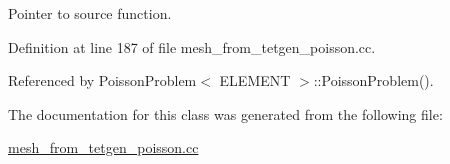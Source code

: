 Pointer to source function. 



Definition at line 187 of file mesh\+\_\+from\+\_\+tetgen\+\_\+poisson.\+cc.



Referenced by Poisson\+Problem$<$ E\+L\+E\+M\+E\+N\+T $>$\+::\+Poisson\+Problem().



The documentation for this class was generated from the following file\+:\begin{DoxyCompactItemize}
\item 
\hyperlink{mesh__from__tetgen__poisson_8cc}{mesh\+\_\+from\+\_\+tetgen\+\_\+poisson.\+cc}\end{DoxyCompactItemize}
